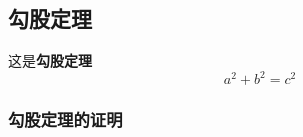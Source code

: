 
\subsection{勾股定理}
这是\textbf{勾股定理}
\begin{equation}
a^2 + b^2 = c^2
\end{equation}


\subsubsection{勾股定理的证明}
